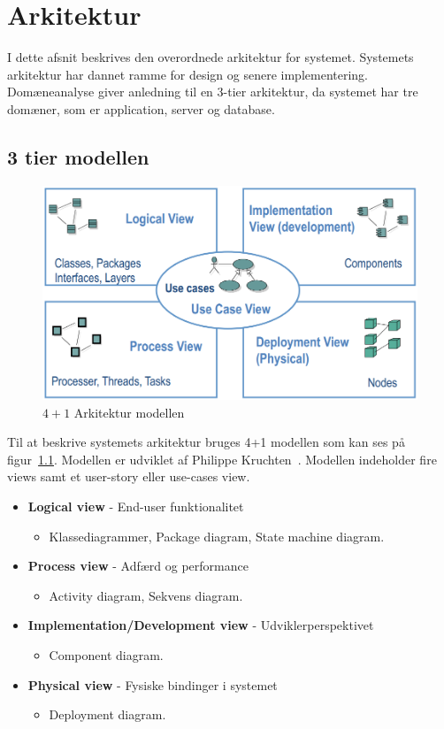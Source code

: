 \chapter{Arkitektur}
I dette afsnit beskrives den overordnede arkitektur for systemet. Systemets arkitektur har dannet ramme for design og senere implementering. Domæneanalyse giver anledning til en 3-tier arkitektur, da systemet har tre domæner, som er application, server og database.

\section{3 tier modellen}

\begin{figure}[h]
	\centering
	\includegraphics[width=0.9\linewidth]{figs/arkitektur/41model}
	\caption{$4+1$ Arkitektur modellen \cite{flylib}}
	\label{fig:41model}
\end{figure}

Til at beskrive systemets arkitektur bruges 4+1 modellen som kan ses på figur~\ref{fig:41model}. Modellen er udviklet af Philippe Kruchten~\cite{fcgss2007}. Modellen indeholder fire views samt et user-story eller use-cases view.

\begin{itemize}
	\item \textbf{Logical view} - End-user funktionalitet
	\begin{itemize}
		\item Klassediagrammer, Package diagram, State machine diagram.
	\end{itemize}
	\item \textbf{Process view} - Adfærd og performance
	\begin{itemize}
		\item Activity diagram, Sekvens diagram.
	\end{itemize}
	\item \textbf{Implementation/Development view} - Udviklerperspektivet
	\begin{itemize}
		\item Component diagram.
	\end{itemize}
	\item \textbf{Physical view} - Fysiske bindinger i systemet
	\begin{itemize}
		\item Deployment diagram.
	\end{itemize}
\end{itemize}

